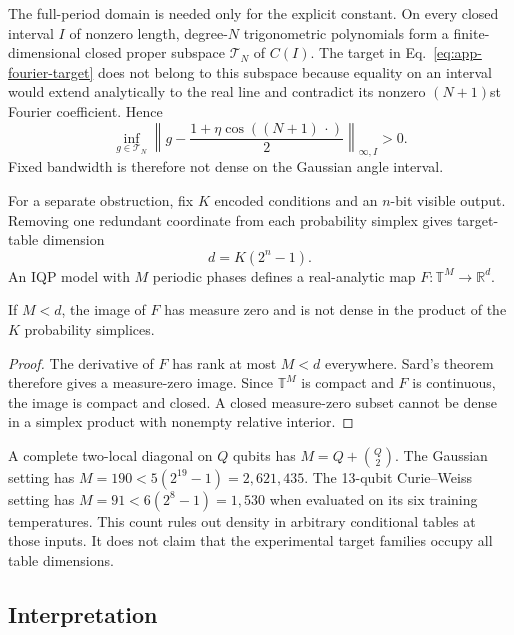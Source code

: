 The full-period domain is needed only for the explicit constant. On every
closed interval $I$ of nonzero length, degree-$N$ trigonometric polynomials
form a finite-dimensional closed proper subspace $\mathcal T_N$ of $C(I)$.
The target in Eq.~\eqref{eq:app-fourier-target} does not belong to this
subspace because equality on an interval would extend analytically to the
real line and contradict its nonzero $(N+1)$st Fourier coefficient. Hence
\begin{equation}
 \inf_{g\in\mathcal T_N}
 \left\|g-\frac{1+\eta\cos((N+1)\,\cdot)}{2}\right\|_{\infty,I}>0.
 \label{eq:app-interval-gap}
\end{equation}
Fixed bandwidth is therefore not dense on the Gaussian angle interval.

For a separate obstruction, fix $K$ encoded conditions and an $n$-bit
visible output. Removing one redundant coordinate from each probability
simplex gives target-table dimension
\begin{equation}
 d=K(2^n-1).
 \label{eq:app-table-dimension}
\end{equation}
An IQP model with $M$ periodic phases defines a real-analytic map
$F:\mathbb T^M\to\mathbb R^d$.

\begin{proposition}
\label{prop:app-dimension}
If $M<d$, the image of $F$ has measure zero and is not dense in the product
of the $K$ probability simplices.
\end{proposition}

\begin{proof}
The derivative of $F$ has rank at most $M<d$ everywhere. Sard's theorem
therefore gives a measure-zero image. Since $\mathbb T^M$ is compact and $F$
is continuous, the image is compact and closed. A closed measure-zero subset
cannot be dense in a simplex product with nonempty relative interior.
\end{proof}

A complete two-local diagonal on $Q$ qubits has
$M=Q+\binom Q2$. The Gaussian setting has
$M=190<5(2^{19}-1)=2{,}621{,}435$. The 13-qubit Curie--Weiss setting has
$M=91<6(2^8-1)=1{,}530$ when evaluated on its six training temperatures.
This count rules out density in arbitrary conditional tables at those inputs.
It does not claim that the experimental target families occupy all table
dimensions.

\subsection{Interpretation}

